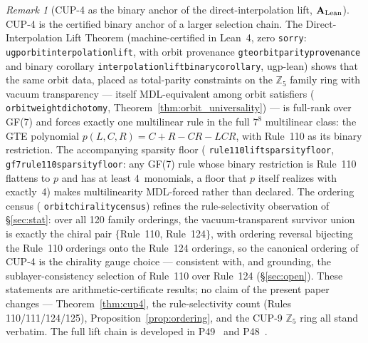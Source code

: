 \documentclass[11pt]{article}
\theoremstyle{remark}
\newtheorem{remark}[theorem]{Remark}
\newcommand{\lean}[1]{%
  \penalty-100
  \begingroup\def\_{\textunderscore\allowbreak}\texttt{#1}\endgroup}
\newcommand{\CatAL}{\ensuremath{\textbf{A}_{\rm Lean}}}
\begin{document}
\begin{remark}[CUP-4 as the binary anchor of the direct-interpolation lift, $\CatAL$]
\label{rem:triangle_lift}
CUP-4 is the certified binary anchor of a larger selection chain.
The Direct-Interpolation Lift Theorem (machine-certified in Lean~4, zero \texttt{sorry}:
\lean{ugp\_orbit\_interpolation\_lift}, with orbit provenance
\lean{gte\_orbit\_parity\_provenance} and binary corollary
\lean{interpolation\_lift\_binary\_corollary}, ugp-lean) shows that the same orbit data,
placed as total-parity constraints on the $\mathbb{Z}_5$ family ring with vacuum
transparency --- itself MDL-equivalent among orbit satisfiers
(\lean{orbit\_weight\_dichotomy}, Theorem~\ref{thm:orbit_universality}) --- is full-rank
over GF(7) and forces exactly one multilinear rule in the full $7^8$ multilinear class:
the GTE polynomial $p(L,C,R) = C + R - CR - LCR$, with Rule~110 as its binary restriction.
The accompanying sparsity floor (\lean{rule110\_lift\_sparsity\_floor},
\lean{gf7\_rule110\_sparsity\_floor}: any GF(7) rule whose binary restriction is Rule~110
flattens to $p$ and has at least 4~monomials, a floor that $p$ itself realizes with
exactly~4) makes multilinearity MDL-forced rather than declared.
The ordering census (\lean{orbit\_chirality\_census}) refines the rule-selectivity
observation of \S\ref{sec:stat}: over all 120 family orderings, the vacuum-transparent
survivor union is exactly the chiral pair $\{$Rule~110, Rule~124$\}$, with ordering
reversal bijecting the Rule~110 orderings onto the Rule~124 orderings, so the canonical
ordering of CUP-4 is the chirality gauge choice --- consistent with, and grounding, the
sublayer-consistency selection of Rule~110 over Rule~124 (\S\ref{sec:open}).
These statements are arithmetic-certificate results; no claim of the present paper
changes --- Theorem~\ref{thm:cup4}, the rule-selectivity count (Rules 110/111/124/125),
Proposition~\ref{prop:ordering}, and the CUP-9 $\mathbb{Z}_5$ ring all stand verbatim.
The full lift chain is developed in P49~\cite{SpivackGTEPolynomialWolfram} and
P48~\cite{SpivackGTECompleteFramework}.
\end{remark}
\end{document}
